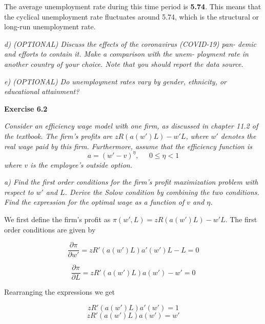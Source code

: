 \documentclass[11pt]{article} %
\begin{document}
The average unemployment rate during this time period is \textbf{5.74}. This means that the cyclical unemployment rate fluctuates around 5.74, which is the structural or long-run unemployment rate.




\pagebreak
\textit{d) (OPTIONAL) Discuss the effects of the coronavirus (COVID-19) pan-
demic and efforts to contain it. Make a comparison with the unem-
ployment rate in another country of your choice. Note that you should
report the data source.}\par




\pagebreak
\textit{e) (OPTIONAL) Do unemployment rates vary by gender, ethnicity, or
educational attainment?}\par




\pagebreak
\textbf{\Large{Exercise 6.2}}

\textit{Consider an efficiency wage model with one firm, as discussed in chapter 11.2
of the textbook. The firm's profits are $zR\left(a(w')L\right)-w'L$, where $w'$ denotes the real wage paid by this firm. Furthermore, assume that the efficiency function is}
\begin{equation}
    a=(w'-v)^{\eta}, \;\;\;\;\; 0\leq\eta<1
\end{equation}
\textit{where $v$ is the employee's outside option.}

\textit{a) Find the first order conditions for the firm's profit maximization problem with respect to $w'$ and $L$. Derive the Solow condition by combining the two conditions. Find the expression for the optimal wage as a function of $v$ and $\eta$.}\par

\bigskip
We first define the firm's profit as $\pi(w',L)=zR\left(a(w')L\right)-w'L$. The first order conditions are given by

\bigskip
\begin{equation}
    \frac{\partial \pi}{\partial w'} = zR'\left(a(w')L\right) a'(w')L - L = 0    
\end{equation}

\begin{equation}
    \frac{\partial \pi}{\partial L} = zR'\left(a(w')L\right) a(w') - w' = 0    
\end{equation}

\bigskip
Rearranging the expressions we get

\bigskip
\begin{equation}
    zR'\left(a(w')L\right)a'(w') = 1
\end{equation}
\begin{equation}
    zR'\left(a(w')L\right)a(w') = w'
\end{equation}
\end{document}
